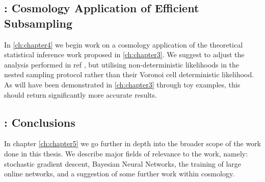 \subsection*{: Cosmology Application of Efficient Subsampling}

In \cref{ch:chapter4} we begin work on a cosmology application of the theoretical statistical inference work proposed in \cref{ch:chapter3}. We suggest to adjust the analysis performed in ref \cite{Mihaylov_2020}, but utilising non-deterministic likelihoods in the nested sampling protocol rather than their Voronoi cell deterministic likelihood. As will have been demonstrated in \cref{ch:chapter3} through toy examples, this should return significantly more accurate results.

\subsection*{: Conclusions}

In chapter \cref{ch:chapter5} we go further in depth into the broader scope of the work done in this thesis. We describe major fields of relevance to the work, namely: stochastic gradient descent, Bayesian Neural Networks, the training of large online networks, and a suggestion of some further work within cosmology.